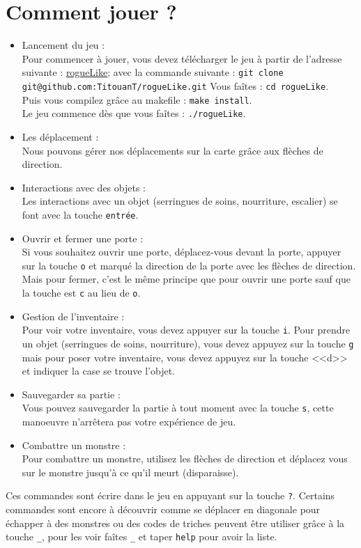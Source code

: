 \documentclass[11pt]{report}
\begin{document}
	\section{Comment jouer ?}
		\begin{itemize}
			\item{Lancement du jeu : \\}
				Pour commencer à jouer, vous devez télécharger le jeu à partir de l'adresse suivante : \href{https://github.com/TitouanT/rogueLike/} {rogueLike}; avec la commande suivante : \texttt{git clone git@github.com:TitouanT/rogueLike.git}
				Vous faîtes : \texttt{cd rogueLike}. \\
				Puis vous compilez grâce au makefile : \texttt{make install}. \\
				Le jeu commence dès que vous faîtes : \texttt{./rogueLike}.	
			\item{Les déplacement : \\}
				Nous pouvons gérer nos déplacements sur la carte grâce aux flèches de direction. 
			\item{Interactions avec des objets : \\}	
				Les interactions avec un objet (serringues de soins, nourriture, escalier) se font avec la touche \texttt{entrée}.
			\item{Ouvrir et fermer une porte :\\}	
				Si vous souhaitez ouvrir une porte, déplacez-vous devant la porte, appuyer sur la touche \texttt{o} et marqué la direction de la porte avec les flèches de direction.
				Mais pour fermer, c'est le même principe que pour ouvrir une porte sauf que la touche est \texttt{c} au lieu de \texttt{o}.
			\item{Gestion de l'inventaire : \\}
				Pour voir votre inventaire, vous devez appuyer sur la touche \texttt{i}. Pour prendre un objet (serringues de soins, nourriture), vous devez appuyez sur la touche \texttt{g} mais pour poser votre inventaire, vous devez appuyez sur la touche <<d>> et indiquer la case se trouve l'objet.
			\item{Sauvegarder sa partie :\\}
				Vous pouvez sauvegarder la partie à tout moment avec la touche \texttt{s}, cette manoeuvre n'arrêtera pas votre expérience de jeu.
			\item{Combattre un monstre :\\}
				Pour combattre un monstre, utilisez les flèches de direction et déplacez vous sur le monstre jusqu'à ce qu'il meurt (disparaisse).		
		\end{itemize}
		Ces commandes sont écrire dans le jeu en appuyant sur la touche \texttt{?}.
		Certains commandes sont encore à découvrir comme se déplacer en diagonale pour échapper à des monstres ou des codes de triches peuvent être utiliser grâce à la touche \texttt{\_}, pour les voir faîtes \texttt{\_} et taper \texttt{help} pour avoir la liste.
		
\end{document}
